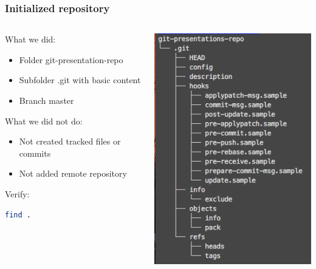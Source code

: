 \documentclass[hyperref={pdfpagelabels=false}]{beamer}
\begin{document}
\begin{frame}[fragile]
\frametitle{Initialized repository}
	\begin{columns}
		\begin{column}{0.6\textwidth}
			What we did:
			\begin{itemize}
				\item Folder git-presentation-repo
				\item Subfolder .git with basic content
				\item Branch master
			\end{itemize}	
			What we did not do:
			\begin{itemize}
				\item Not created tracked files or commits
				\item Not added remote repository
			\end{itemize}
			Verify:
			\begin{lstlisting}[language=bash, caption={List all folders and files}]
				find .
			\end{lstlisting}
		\end{column}
		\begin{column}{0.4\textwidth}
			\includegraphics[width=\textwidth]{empty-repo-tree}
		\end{column}	
	\end{columns}
\end{frame} 
\end{document}
